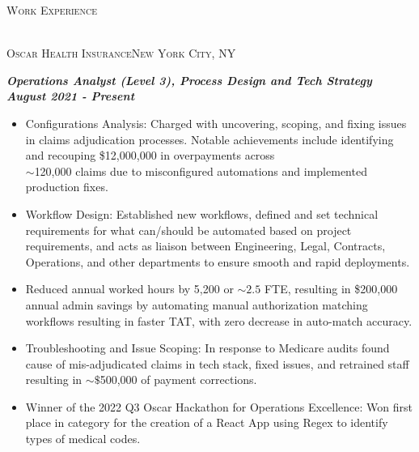\documentclass[a4paper]{article}
\newcommand{\lineunder} {
    \vspace*{-8pt} \\
    \hspace*{-18pt} \hrulefill \\
}
\newcommand{\header} [1] {
    {\hspace*{-18pt}\vspace*{6pt} \textsc{#1}}
    \vspace*{-6pt} \lineunder
}
\newcommand{\jobtitle} [1] {
    {\hspace*{-18pt} \textsc{#1}}
    
}
\begin{document}
\header{Work Experience}
\vspace{1mm}
\jobtitle{Oscar Health Insurance\hfill New York City, NY}
\hspace*{-16pt}\textit{\textbf{Operations Analyst (Level 3), Process Design and Tech Strategy}} \hfill \textit{\textbf{August 2021 - Present}}\\
\vspace{-1mm}
\begin{itemize}[leftmargin=10pt,align=left]
    \item Configurations Analysis: Charged with uncovering, scoping, and fixing issues in claims adjudication processes. 
        Notable achievements include identifying and recouping \$12,000,000 in overpayments across\\
        $\sim$120,000 claims due to misconfigured automations and implemented production fixes.

    \item   Workflow Design: Established new workflows, defined and set technical requirements for what can/should be automated based on project requirements,
     and acts as liaison between Engineering, Legal, Contracts, Operations, and other departments to ensure smooth and rapid deployments.
     \item Reduced annual worked hours by 5,200 or $\sim2.5$ FTE, resulting in \$200,000 annual admin savings by automating manual authorization matching workflows resulting in faster TAT, with zero decrease in auto-match accuracy.
     \item 	Troubleshooting and Issue Scoping: In response to Medicare audits found cause of mis-adjudicated claims in tech stack, fixed issues, and retrained staff
     resulting in $\sim\$$500,000 of payment corrections.

     \item Winner of the 2022 Q3 Oscar Hackathon for Operations Excellence: Won first place in category for the creation of a React App using Regex to identify types of medical codes.
\end{itemize}
\end{document}
